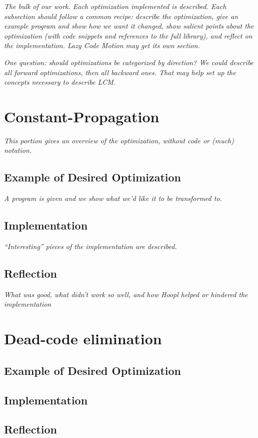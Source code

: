 \documentclass[12pt]{report}
\begin{document}
\emph{The bulk of our work. Each optimization implemented is
  described. Each subsection should follow a common recipe: describe
  the optimization, give an example program and show how we want it
  changed, show salient points about the optimization (with code
  snippets and references to the full library), and reflect on the
  implementation.  Lazy Code Motion may get its own section.}

\emph{One question: should optimizations be categorized by direction? We could
describe all forward optimizations, then all backward ones. That may help
set up the concepts necessary to describe LCM.}

\section{Constant-Propagation}
\emph{This portion gives an overview of the optimization, without
code or (much) notation.}

\subsection{Example of Desired Optimization}
\emph{A program is given and we show what we'd like it to be
transformed to.}

\subsection{Implementation}
\emph{``Interesting'' pieces of the implementation are described.}

\subsection{Reflection}
\emph{What was good, what didn't work so well, and how Hoopl helped
or hindered the implementation}

\section{Dead-code elimination}
\subsection{Example of Desired Optimization}
\subsection{Implementation}
\subsection{Reflection}
\end{document}

